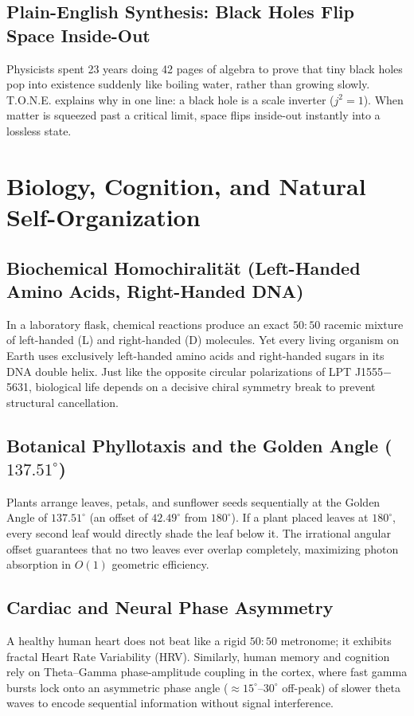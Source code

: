 \documentclass[11pt,a4paper,oneside]{article}
\def\texttt#1{#1}%
\theoremstyle{definition}
\begin{document}
\subsection{Plain-English Synthesis: Black Holes Flip Space Inside-Out}
\begin{noobbox}
Physicists spent 23 years doing 42 pages of algebra to prove that tiny black holes pop into existence suddenly like boiling water, rather than growing slowly. T.O.N.E. explains why in one line: a black hole is a scale inverter ($j^2 = 1$). When matter is squeezed past a critical limit, space flips inside-out instantly into a lossless state.
\end{noobbox}
\section{Biology, Cognition, and Natural Self-Organization}
\subsection{Biochemical Homochiralität (Left-Handed Amino Acids, Right-Handed DNA)}
In a laboratory flask, chemical reactions produce an exact $50:50$ racemic mixture of left-handed (L) and right-handed (D) molecules. Yet every living organism on Earth uses exclusively left-handed amino acids and right-handed sugars in its DNA double helix. Just like the opposite circular polarizations of \texttt{LPT J1555$-$5631}, biological life depends on a decisive chiral symmetry break to prevent structural cancellation.
\subsection{Botanical Phyllotaxis and the Golden Angle ($137.51^\circ$)}
Plants arrange leaves, petals, and sunflower seeds sequentially at the Golden Angle of $137.51^\circ$ (an offset of $42.49^\circ$ from $180^\circ$). If a plant placed leaves at $180^\circ$, every second leaf would directly shade the leaf below it. The irrational angular offset guarantees that no two leaves ever overlap completely, maximizing photon absorption in $O(1)$ geometric efficiency.
\subsection{Cardiac and Neural Phase Asymmetry}
A healthy human heart does not beat like a rigid $50:50$ metronome; it exhibits fractal Heart Rate Variability (HRV). Similarly, human memory and cognition rely on Theta–Gamma phase-amplitude coupling in the cortex, where fast gamma bursts lock onto an asymmetric phase angle ($\approx 15^\circ$–$30^\circ$ off-peak) of slower theta waves to encode sequential information without signal interference.
\end{document}
